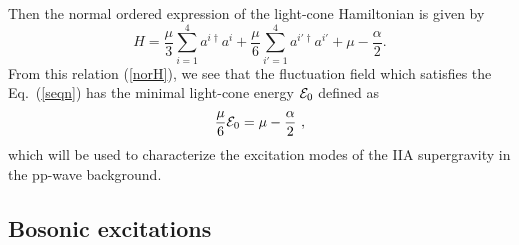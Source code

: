 \documentclass[a4paper,12pt]{article}
\numberwithin{equation}{section}
\begin{document}
Then the normal ordered expression of the light-cone Hamiltonian is
given by
\begin{equation}\label{norH}
H = \frac{\mu}3 \sum_{i=1}^4 a^{i \dagger} a^i
    + \frac{\mu}6 \sum_{i'=1}^4 a^{i' \dagger} a^{i'}
    + \mu - \frac{\alpha}{2}.
\end{equation}
From this relation (\ref{norH}), we see that the fluctuation field which
satisfies the Eq.~(\ref{seqn}) has the minimal light-cone energy
${\cal E}_0$ defined as
\begin{equation}\label{lstE}
\frac{\mu}{6} {\cal E}_0 = \mu - \frac{\alpha}2 ~,
\end{equation}
which will be used to characterize the excitation modes of the IIA
supergravity in the pp-wave background.


\subsection{Bosonic excitations}
\label{b-sugra}
\end{document}
